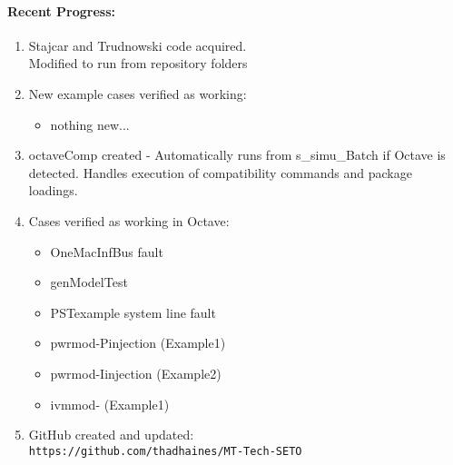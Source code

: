 \documentclass[12pt]{article}
\begin{document}
\begin{multicols}{2}
\raggedright

\paragraph{Recent Progress:}
	\begin{enumerate}
		\itemsep0em 
		\item Stajcar and Trudnowski code acquired. \\ 
		Modified to run from repository folders
		\item New example cases verified as working:
		\begin{itemize}
			\item nothing new...
		\end{itemize}
		\item octaveComp created - Automatically runs from s\_simu\_Batch if Octave is detected. Handles execution of compatibility commands and package loadings.
		
		\item Cases verified as working in Octave:
				\begin{itemize}
					\itemsep0em 
					\footnotesize
					\item OneMacInfBus fault
					\item genModelTest
					\item PSTexample system line fault
					\item pwrmod-Pinjection (Example1)
					\item pwrmod-Iinjection (Example2)
					\item ivmmod- (Example1)
				\end{itemize}
		
		\item GitHub created and updated:\\
	{\footnotesize	\verb|https://github.com/thadhaines/MT-Tech-SETO| }\\
	\end{enumerate}
	

\end{multicols}
\end{document}
